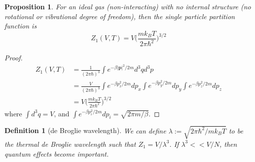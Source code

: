 \documentclass[a4paper]{article}
\theoremstyle{new}
\newtheorem{defi}{Definition}[section]
\newtheorem{prop}{Proposition}[section]
\begin{document}
\begin{prop}
For an ideal gas (non-interacting) with no internal structure (no rotational or vibrational degree of freedom), then the single particle partition function is
$$Z_1(V,T)=V\bigg(\frac{mk_BT}{2\pi\hbar^2}\bigg)^{3/2}$$
\end{prop}
\begin{proof}
\begin{align}
Z_1(V,T)&=\frac{1}{(2\pi\hbar)^3}\int e^{-\beta |\mathbf{p}|^2/2m}d^3qd^3p\nonumber\\&=\frac{V}{(2\pi\hbar)^3}\int e^{-\beta p_x^2/2m}dp_x\int e^{-\beta p_y^2/2m}dp_y\int e^{-\beta p_z^2/2m}dp_z\nonumber\\&=V\bigg(\frac{mk_BT}{2\pi\hbar^2}\bigg)^{3/2}\nonumber
\end{align}
where $\int d^3q=V$, and $\int e^{-\beta p_i^2/2m}dp_i=\sqrt{2\pi m/\beta}$.
\end{proof}
\begin{defi}[de Broglie wavelength]
We can define $\lambda:=\sqrt{2\pi\hbar^2/mk_BT}$ to be the thermal de Broglie wavelength such that $Z_1=V/\lambda^3$. If $\lambda^3<<V/N$, then quantum effects become important.
\end{defi}
\end{document}
